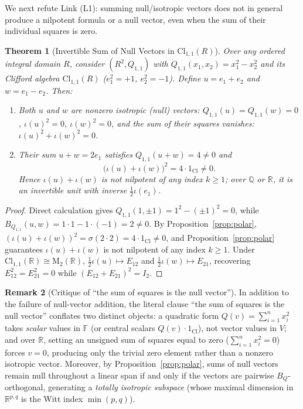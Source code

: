 \documentclass[11pt]{article}
\newtheorem{theorem}{Theorem}[section]
\theoremstyle{definition}
\newtheorem{remark}[theorem]{Remark}
\newcommand{\Cl}{\mathrm{Cl}}
\newcommand{\Mat}{\mathrm{M}}
\newcommand{\F}{\mathbb{F}}
\newcommand{\R}{\mathbb{R}}
\newcommand{\Q}{\mathbb{Q}}
\begin{document}
We next refute Link (L1): summing null/isotropic vectors does not in general produce a
nilpotent formula or a null vector, even when the sum of their individual squares is zero.

\begin{theorem}[Invertible Sum of Null Vectors in $\Cl_{1,1}(R)$]\label{thm:nullsum}
Over any ordered integral domain $R$, consider $(R^2, Q_{1,1})$ with
$Q_{1,1}(x_1, x_2) = x_1^2 - x_2^2$ and its Clifford algebra $\Cl_{1,1}(R)$ ($e_1^2 = +1$,
$e_2^2 = -1$). Define $u = e_1 + e_2$ and $w = e_1 - e_2$. Then:
\begin{enumerate}
  \item Both $u$ and $w$ are nonzero isotropic (null) vectors: $Q_{1,1}(u) = Q_{1,1}(w) = 0$,
    $\iota(u)^2 = 0$, $\iota(w)^2 = 0$, and the sum of their squares vanishes:
    $\iota(u)^2 + \iota(w)^2 = 0$.
  \item Their sum $u + w = 2 e_1$ satisfies $Q_{1,1}(u + w) = 4 \ne 0$ and
    \[
      \bigl(\iota(u) + \iota(w)\bigr)^2 = 4 \cdot 1_{\Cl} \ne 0.
    \]
    Hence $\iota(u) + \iota(w)$ is \emph{not} nilpotent of any index $k \ge 1$; over $\Q$
    or $\R$, it is an invertible unit with inverse $\frac{1}{2}\iota(e_1)$.
\end{enumerate}
\end{theorem}
\begin{proof}
Direct calculation gives $Q_{1,1}(1, \pm 1) = 1^2 - (\pm 1)^2 = 0$, while
$B_{Q_{1,1}}(u, w) = 1 \cdot 1 - 1 \cdot (-1) = 2 \ne 0$. By Proposition~\ref{prop:polar},
$(\iota(u) + \iota(w))^2 = \sigma(2 \cdot 2) = 4 \cdot 1_{\Cl} \ne 0$, and Proposition~\ref{prop:polar}
guarantees $\iota(u) + \iota(w)$ is not nilpotent of any index $k \ge 1$. Under
$\Cl_{1,1}(\R) \cong \Mat_2(\R)$, $\frac{1}{2}\iota(u) \mapsto E_{12}$ and
$\frac{1}{2}\iota(w) \mapsto E_{21}$, recovering $E_{12}^2 = E_{21}^2 = 0$ while
$(E_{12} + E_{21})^2 = I_2$.
\end{proof}

\begin{remark}[Critique of ``the sum of squares is the null vector'']
In addition to the failure of null-vector addition, the literal clause ``the sum of
squares is the null vector'' conflates two distinct objects: a quadratic form
$Q(v) = \sum_{i=1}^n x_i^2$ takes \emph{scalar} values in $\F$ (or central scalars
$Q(v)\cdot 1_{\Cl}$), not vector values in $V$; and over $\R$, setting an unsigned sum of
squares equal to zero ($\sum_{i=1}^n x_i^2 = 0$) forces $v = 0$, producing only the
trivial zero element rather than a nonzero isotropic vector. Moreover, by
Proposition~\ref{prop:polar}, sums of null vectors remain null throughout a linear span
if and only if the vectors are pairwise $B_Q$-orthogonal, generating a \emph{totally
isotropic subspace} (whose maximal dimension in $\R^{p,q}$ is the Witt index $\min(p, q)$).
\end{remark}
\end{document}
